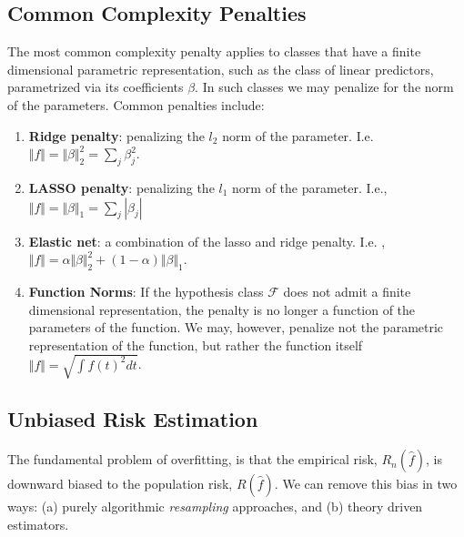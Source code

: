 \documentclass[]{book}
\providecommand{\tightlist}{%
  \setlength{\itemsep}{0pt}\setlength{\parskip}{0pt}}
\theoremstyle{definition}
\theoremstyle{definition}
\theoremstyle{definition}
\theoremstyle{remark}
\begin{document}
\subsection{Common Complexity
Penalties}\label{common-complexity-penalties}

The most common complexity penalty applies to classes that have a finite
dimensional parametric representation, such as the class of linear
predictors, parametrized via its coefficients \(\beta\). In such classes
we may penalize for the norm of the parameters. Common penalties
include:

\begin{enumerate}
\def\labelenumi{\arabic{enumi}.}
\tightlist
\item
  \textbf{Ridge penalty}: penalizing the \(l_2\) norm of the parameter.
  I.e. \(\Vert f \Vert=\Vert \beta \Vert_2^2=\sum_j \beta_j^2\).
\item
  \textbf{LASSO penalty}: penalizing the \(l_1\) norm of the parameter.
  I.e., \(\Vert f \Vert=\Vert \beta \Vert_1=\sum_j |\beta_j|\)
\item
  \textbf{Elastic net}: a combination of the lasso and ridge penalty.
  I.e.
  ,\(\Vert f \Vert= \alpha \Vert \beta \Vert_2^2 + (1-\alpha) \Vert \beta \Vert_1\).
\item
  \textbf{Function Norms}: If the hypothesis class \(\mathcal{F}\) does
  not admit a finite dimensional representation, the penalty is no
  longer a function of the parameters of the function. We may, however,
  penalize not the parametric representation of the function, but rather
  the function itself \(\Vert f \Vert=\sqrt{\int f(t)^2 dt}\).
\end{enumerate}

\subsection{Unbiased Risk Estimation}\label{unbiased-risk-estimation}

The fundamental problem of overfitting, is that the empirical risk,
\(R_n(\hat f)\), is downward biased to the population risk,
\(R(\hat f)\). We can remove this bias in two ways: (a) purely
algorithmic \emph{resampling} approaches, and (b) theory driven
estimators.
\end{document}
